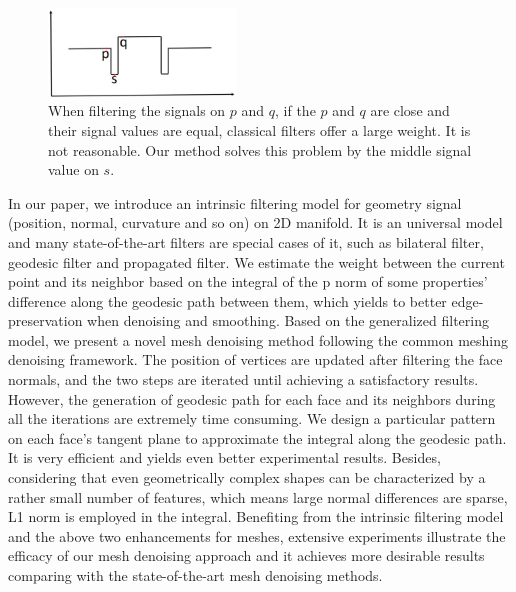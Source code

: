 \begin{figure}
\centering
\includegraphics[width = 5.0cm]{results/Relation/relation.jpg}
\vspace{-0.5mm}
\caption{ When filtering the signals on $p$ and $q$, if the $p$ and $q$ are close and their signal values are equal, classical filters offer a large weight.
It is not reasonable. Our method solves this problem by the middle signal value on $s$. }
\label{Fig:relation}
\end{figure}

In our paper, we introduce an intrinsic filtering model for geometry signal (position, normal, curvature and so on) on 2D manifold. 
It is an universal model and many state-of-the-art filters are special cases of it, such as bilateral filter, geodesic filter and propagated filter. 
We estimate the weight between the current point and its neighbor based on the integral of the p norm of some properties' difference along the geodesic path between them, 
which yields to better edge-preservation when denoising and smoothing. 
Based on the generalized filtering model, we present a novel mesh denoising method following the common meshing denoising framework. 
The position of vertices are updated after filtering the face normals, and the two steps are iterated until achieving a satisfactory results.
However, the generation of geodesic path for each face and its neighbors during all the iterations are extremely time consuming. We design a particular pattern on each face's tangent plane to approximate the integral along the geodesic path. It is very efficient and yields even better experimental results.
Besides, considering that even geometrically complex shapes can be characterized by a rather small number of features, which means large normal differences are sparse, L1 norm is employed in the integral.
Benefiting from the intrinsic filtering model and the above two enhancements for meshes, extensive experiments illustrate the efficacy of our mesh denoising approach and it achieves more desirable results comparing with the state-of-the-art mesh denoising methods.
